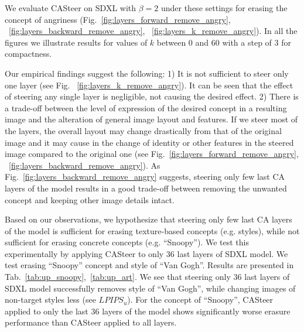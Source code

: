 We evaluate CASteer on SDXL with $\beta=2$ under these settings for erasing the concept of angriness (Fig.~\ref{fig:layers_forward_remove_angry}, ~\ref{fig:layers_backward_remove_angry}, ~\ref{fig:layers_k_remove_angry}). In all the figures we illustrate results for values of $k$ between 0 and 60 with a step of 3 for compactness. 

Our empirical findings suggest the following: 
1) It is not sufficient to steer only one layer (see Fig. ~\ref{fig:layers_k_remove_angry}). It can be seen that the effect of steering any single layer is negligible, not causing the desired effect. 
%
2) There is a trade-off between the level of expression of the desired concept in a resulting image and the alteration of general image layout and features. If we steer most of the layers, the overall layout may change drastically from that of the original image and it may cause in the change of identity or other features in the steered image compared to the original one (see Fig.~\ref{fig:layers_forward_remove_angry}, ~\ref{fig:layers_backward_remove_angry}). As Fig.~\ref{fig:layers_backward_remove_angry} suggests, steering only few last CA layers of the model results in a good trade-off between removing the unwanted concept and keeping other image details intact. 

Based on our observations, we hypothesize that steering only few last CA layers of the model is sufficient for erasing texture-based concepts (e.g. styles), while not sufficient for erasing concrete concepts (e.g. ``Snoopy''). We test this experimentally by applying CASteer to only 36 last layers of SDXL model. We test erasing ``Snoopy'' concept and style of ``Van Gogh''. Results are presented in Tab.~\ref{tab:up_snoopy},~\ref{tab:up_art}. We see that steering only 36 last layers of SDXL model successfully removes style of ``Van Gogh'', while changing images of non-target styles less (see $LPIPS_u$). For the concept of ``Snoopy'', CASteer applied to only the last 36 layers of the model shows significantly worse erasure performance than CASteer applied to all layers.





